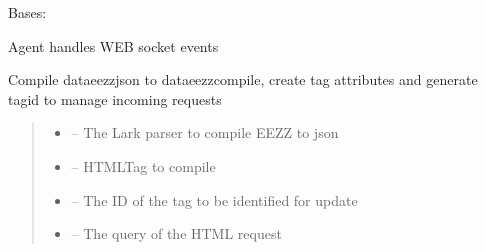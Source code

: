 \documentclass[letterpaper,10pt,english]{sphinxmanual}
\begin{document}
\begin{savenotes}\begin{fulllineitems}
\label{\detokenize{eezz:eezz.http_agent.THttpAgent}}
\pysigstartsignatures
{}
\pysigstopsignatures
\sphinxAtStartPar
Bases: 

\sphinxAtStartPar
Agent handles WEB socket events

\begin{savenotes}\begin{fulllineitems}
\label{\detokenize{eezz:eezz.http_agent.THttpAgent.compile_data}}
\pysigstartsignatures
{}
\pysigstopsignatures
\sphinxAtStartPar
Compile data\sphinxhyphen{}eezz\sphinxhyphen{}json to data\sphinxhyphen{}eezz\sphinxhyphen{}compile,
create tag attributes and generate tag\sphinxhyphen{}id to manage incoming requests
\begin{quote}\begin{description}
\begin{itemize}
\item {} 
\sphinxAtStartPar
{} – The Lark parser to compile EEZZ to json

\item {} 
\sphinxAtStartPar
{} – HTML\sphinxhyphen{}Tag to compile

\item {} 
\sphinxAtStartPar
{} – The ID of the tag to be identified for update

\item {} 
\sphinxAtStartPar
{} – The query of the HTML request


\end{itemize}
\end{description}
\end{quote}
\end{fulllineitems}
\end{savenotes}
\end{fulllineitems}
\end{savenotes}
\end{document}
